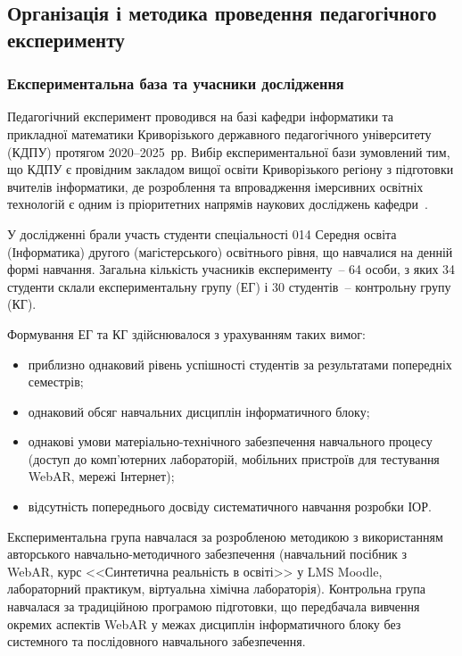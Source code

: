 \subsection{Організація і методика проведення педагогічного експерименту}\label{sec:3.2}

\subsubsection{Експериментальна база та учасники дослідження}

Педагогічний експеримент проводився на базі кафедри інформатики та прикладної математики Криворізького державного педагогічного університету (КДПУ) протягом 2020--2025~рр. Вибір експериментальної бази зумовлений тим, що КДПУ є провідним закладом вищої освіти Криворізького регіону з підготовки вчителів інформатики, де розроблення та впровадження імерсивних освітніх технологій є одним із пріоритетних напрямів наукових досліджень кафедри~\cite{Semerikov2022IERDesign}.

У дослідженні брали участь студенти спеціальності 014 Середня освіта (Інформатика) другого (магістерського) освітнього рівня, що навчалися на денній формі навчання. Загальна кількість учасників експерименту~-- 64 особи, з яких 34 студенти склали експериментальну групу (ЕГ) і 30 студентів~-- контрольну групу (КГ).

Формування ЕГ та КГ здійснювалося з урахуванням таких вимог:
\begin{itemize}
\item приблизно однаковий рівень успішності студентів за результатами попередніх семестрів;
\item однаковий обсяг навчальних дисциплін інформатичного блоку;
\item однакові умови матеріально-технічного забезпечення навчального процесу (доступ до комп'ютерних лабораторій, мобільних пристроїв для тестування WebAR, мережі Інтернет);
\item відсутність попереднього досвіду систематичного навчання розробки ІОР.
\end{itemize}

Експериментальна група навчалася за розробленою методикою з використанням авторського навчально-методичного забезпечення (навчальний посібник з WebAR, курс <<Синтетична реальність в освіті>> у LMS Moodle, лабораторний практикум, віртуальна хімічна лабораторія). Контрольна група навчалася за традиційною програмою підготовки, що передбачала вивчення окремих аспектів WebAR у межах дисциплін інформатичного блоку без системного та послідовного навчального забезпечення.


